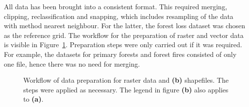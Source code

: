 \documentclass[
  letterpaper,
  DIV=11,
  numbers=noendperiod]{scrreprt}
\begin{document}
All data has been brought into a consistent format. This required
merging, clipping, reclassification and snapping, which includes
resampling of the data with method nearest neighbour. For the latter,
the forest loss dataset was chosen as the reference grid. The workflow
for the preparation of raster and vector data is visible in
Figure~\ref{fig-data_preparation}. Preparation steps were only carried
out if it was required. For example, the datasets for primary forests
and forest fires consisted of only one file, hence there was no need for
merging.

\begin{figure}[H]

\begin{minipage}[t]{\linewidth}

{\centering 


}

\end{minipage}%
\newline
\begin{minipage}[t]{\linewidth}

{\centering 


}

\end{minipage}%

\caption{\label{fig-data_preparation}Workflow of data preparation for
raster data and \textbf{(b)} shapefiles. The steps were applied as
necessary. The legend in figure \textbf{(b)} also applies to
\textbf{(a)}.}

\end{figure}
\end{document}
